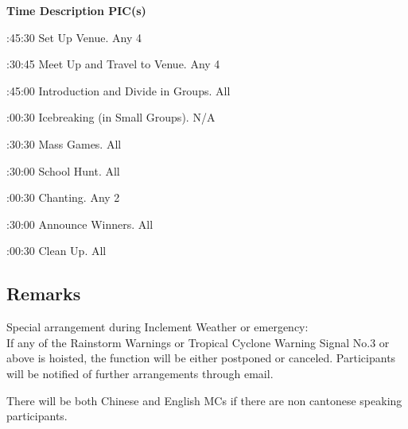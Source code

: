 \bTR\bTH    \bf{Time}
\eTH\bTH    \bf{Description}
\eTH\bTH    \bf{PIC(s)}
\eTH\eTR

\eTABLEhead
\bTABLEbody

\bTR{}:45:30
\eTD\bTD Set Up Venue.
\eTD\bTD Any 4
\eTD\eTR

\bTR{}:30:45
\eTD\bTD Meet Up and Travel to Venue.
\eTD\bTD Any 4
\eTD\eTR

\bTR{}:45:00
\eTD\bTD Introduction and Divide in Groups.
\eTD\bTD All
\eTD\eTR

\bTR{}:00:30
\eTD\bTD Icebreaking (in Small Groups).
\eTD\bTD N/A
\eTD\eTR

\bTR{}:30:30
\eTD\bTD Mass Games.
\eTD\bTD All
\eTD\eTR

\bTR{}:30:00
\eTD\bTD School Hunt.
\eTD\bTD All
\eTD\eTR

\bTR{}:00:30
\eTD\bTD Chanting.
\eTD\bTD Any 2
\eTD\eTR

\bTR{}:30:00
\eTD\bTD Announce Winners.
\eTD\bTD All
\eTD\eTR

\bTR{}:00:30
\eTD\bTD Clean Up.
\eTD\bTD All
\eTD\eTR

\eTABLEbody
\eTABLE

\subsection{Remarks}
\startitemize
\item Special arrangement during Inclement Weather or emergency: \\
If any of the Rainstorm Warnings or Tropical Cyclone Warning Signal No.3 or above is hoisted, the function will be either postponed or canceled. Participants will be notified of further arrangements through email.
\item There will be both Chinese and English MCs if there are non cantonese speaking participants.
\stopitemize

\stopsection
\pagebreak
